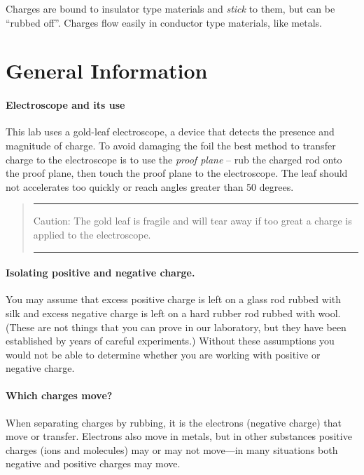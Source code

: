 \begin{multicols}{2}
Charges are bound to insulator type materials and \emph{stick} to them, but can be ``rubbed off''. Charges flow easily in conductor type materials, like metals.

\section{General Information}
\paragraph{Electroscope and its use} 
This lab uses a gold-leaf electroscope, a device that detects the presence and magnitude of charge. 
To avoid damaging the foil the best method to transfer charge to the electroscope is to use the \emph{proof plane} -- rub the charged rod onto the proof plane, then touch the proof plane to the electroscope. The leaf should not accelerates too quickly or reach angles greater than 50 degrees.

\begin{quote} \hrule 
\textsf{Caution:} The gold leaf is fragile and will tear away if too great a charge is applied to the electroscope.
\vspace{7pt}
\hrule 
\end{quote}
\paragraph{Isolating positive and negative charge.}  You may assume that excess positive charge is left on a glass rod rubbed with silk and excess negative charge is left on a hard rubber rod rubbed with wool.  (These are not things that you can prove in our laboratory, but they have been established by years of careful experiments.)  Without these assumptions you would not be able to determine whether you are working with positive or negative charge.

\paragraph{Which charges move?}  When separating charges by rubbing, it is the electrons (negative charge) that move or transfer.  Electrons also move in metals, but in other substances positive charges (ions and molecules) may or may not move---in many situations both negative and positive charges may move. 
\end{multicols}
